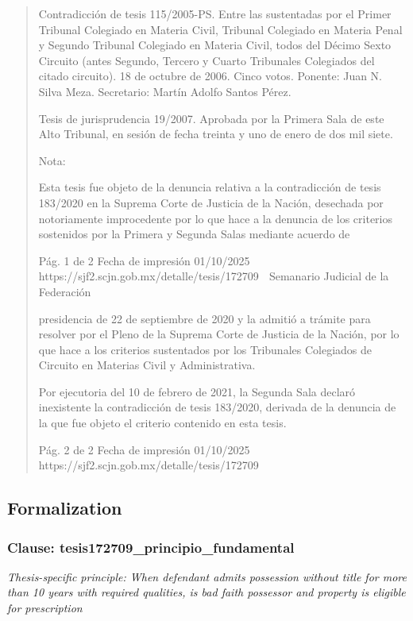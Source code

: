 \documentclass[11pt,a4paper]{article}
\begin{document}
\begin{quote}
Contradicción de tesis 115/2005-PS. Entre las sustentadas por el Primer Tribunal Colegiado en
Materia Civil, Tribunal Colegiado en Materia Penal y Segundo Tribunal Colegiado en Materia Civil,
todos del Décimo Sexto Circuito (antes Segundo, Tercero y Cuarto Tribunales Colegiados del citado
circuito). 18 de octubre de 2006. Cinco votos. Ponente: Juan N. Silva Meza. Secretario: Martín
Adolfo Santos Pérez.

Tesis de jurisprudencia 19/2007. Aprobada por la Primera Sala de este Alto Tribunal, en sesión de
fecha treinta y uno de enero de dos mil siete.

Nota:

Esta tesis fue objeto de la denuncia relativa a la contradicción de tesis 183/2020 en la Suprema
Corte de Justicia de la Nación, desechada por notoriamente improcedente por lo que hace a la
denuncia de los criterios sostenidos por la Primera y Segunda Salas mediante acuerdo de

                                             Pág. 1 de 2             Fecha de impresión 01/10/2025
  https://sjf2.scjn.gob.mx/detalle/tesis/172709
                                                  Semanario Judicial de la Federación

presidencia de 22 de septiembre de 2020 y la admitió a trámite para resolver por el Pleno de la
Suprema Corte de Justicia de la Nación, por lo que hace a los criterios sustentados por los
Tribunales Colegiados de Circuito en Materias Civil y Administrativa.

Por ejecutoria del 10 de febrero de 2021, la Segunda Sala declaró inexistente la contradicción de
tesis 183/2020, derivada de la denuncia de la que fue objeto el criterio contenido en esta tesis.




                                             Pág. 2 de 2          Fecha de impresión 01/10/2025
  https://sjf2.scjn.gob.mx/detalle/tesis/172709

\end{quote}

\subsection{Formalization}

\subsubsection{Clause: tesis172709\_principio\_fundamental}

\textit{Thesis-specific principle: When defendant admits possession without title for more than 10 years with required qualities, is bad faith possessor and property is eligible for prescription}
\end{document}
